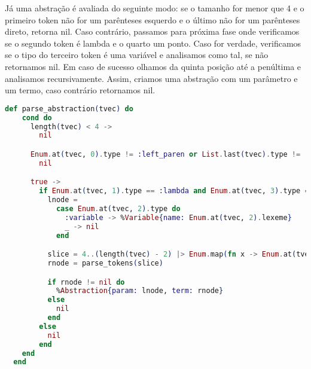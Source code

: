 \documentclass[12pt]{article}
\begin{document}
Já uma abstração é avaliada do seguinte modo: se o tamanho for menor que 4 e o primeiro token não for um parênteses esquerdo e o último não for um parênteses direto, retorna nil. Caso contrário, passamos para próxima fase onde verificamos se o segundo token é lambda e o quarto um ponto. Caso for verdade, verificamos se o tipo do terceiro token é uma variável e analisamos como tal, se não retornamos nil. Em caso de sucesso olhamos da quinta posição até a penúltima e analisamos recursivamente. Assim, criamos uma abstração com um parâmetro e um termo, caso contrário retornamos nil.
\begin{lstlisting}[language=elixir, caption=Função \texttt{parse abstraction}] 
  def parse_abstraction(tvec) do
    cond do
      length(tvec) < 4 ->
        nil

      Enum.at(tvec, 0).type != :left_paren or List.last(tvec).type != :right_paren ->
        nil

      true ->
        if Enum.at(tvec, 1).type == :lambda and Enum.at(tvec, 3).type == :dot do
          lnode =
            case Enum.at(tvec, 2).type do
              :variable -> %Variable{name: Enum.at(tvec, 2).lexeme}
              _ -> nil
            end

          slice = 4..(length(tvec) - 2) |> Enum.map(fn x -> Enum.at(tvec, x) end)
          rnode = parse_tokens(slice)

          if rnode != nil do
            %Abstraction{param: lnode, term: rnode}
          else
            nil
          end
        else
          nil
        end
    end
  end
\end{lstlisting}
\end{document}
